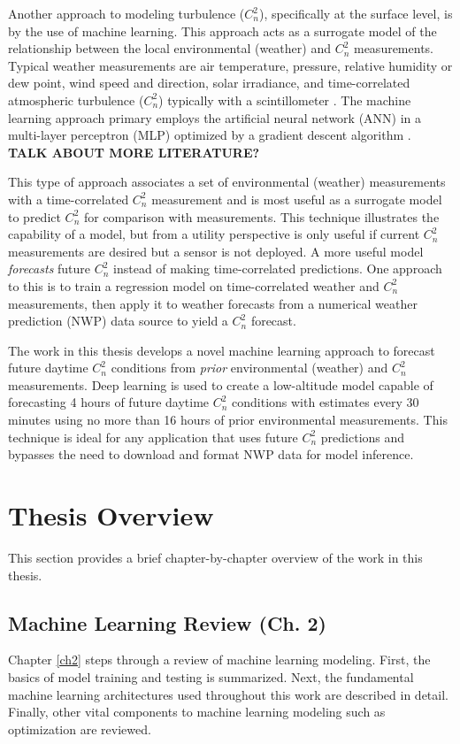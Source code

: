 Another approach to modeling turbulence ($C_{n}^{2}$), specifically at the surface level, is by the use of machine learning. This approach acts as a surrogate model of the relationship between the local environmental (weather) and $C_{n}^{2}$ measurements. Typical weather measurements are air temperature, pressure, relative humidity or dew point, wind speed and direction, solar irradiance, and time-correlated atmospheric turbulence ($C_{n}^{2}$) typically with a scintillometer \cite{Jellen:20, Su:20, Wang:2014}. The machine learning approach primary employs the artificial neural network (ANN) in a multi-layer perceptron (MLP) optimized by a gradient descent algorithm \cite{Su:20, Wang:2014}. \textbf{TALK ABOUT MORE LITERATURE?}

This type of approach associates a set of environmental (weather) measurements with a time-correlated $C_{n}^{2}$ measurement and is most useful as a surrogate model to predict $C_{n}^{2}$ for comparison with measurements. This technique illustrates the capability of a model, but from a utility perspective is only useful if current $C_{n}^{2}$ measurements are desired but a sensor is not deployed. A more useful model \emph{forecasts} future $C_{n}^{2}$ instead of making time-correlated predictions. One approach to this is to train a regression model on time-correlated weather and $C_{n}^{2}$ measurements, then apply it to weather forecasts from a numerical weather prediction (NWP) data source to yield a $C_{n}^{2}$ forecast.

The work in this thesis develops a novel machine learning approach to forecast future daytime $C_{n}^{2}$ conditions from \emph{prior} environmental (weather) and $C_{n}^{2}$ measurements. Deep learning is used to create a low-altitude model capable of forecasting 4 hours of future daytime $C_{n}^{2}$ conditions with estimates every 30 minutes using no more than 16 hours of prior environmental measurements. This technique is ideal for any application that uses future $C_{n}^{2}$ predictions and bypasses the need to download and format NWP data for model inference.

\section{Thesis Overview}
This section provides a brief chapter-by-chapter overview of the work in this thesis.

\subsection{Machine Learning Review (Ch. 2)}
Chapter \ref{ch2} steps through a review of machine learning modeling. First, the basics of model training and testing is summarized. Next, the fundamental machine learning architectures used throughout this work are described in detail. Finally, other vital components to machine learning modeling such as optimization are reviewed.

